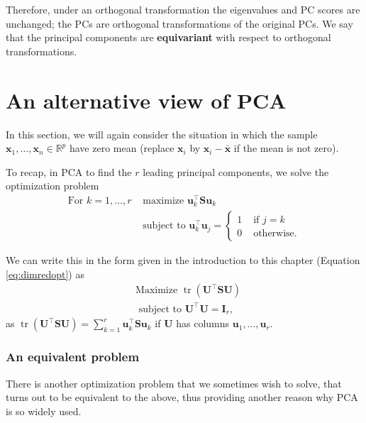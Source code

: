 \documentclass[
]{book}
\theoremstyle{definition}
\theoremstyle{definition}
\theoremstyle{definition}
\theoremstyle{definition}
\theoremstyle{remark}
\begin{document}
Therefore, under an orthogonal transformation the eigenvalues and PC scores are unchanged; the PCs are orthogonal transformations of the original PCs. We say that the principal components are \textbf{equivariant} with respect to orthogonal transformations.

\section{An alternative view of PCA}\label{an-alternative-view-of-pca}

In this section, we will again consider the situation in which the sample \(\mathbf x_1, \ldots ,  \mathbf x_n \in \mathbb{R}^p\) have zero mean (replace \(\mathbf x_i\) by \(\mathbf x_i-\bar{\mathbf x}\) if the mean is not zero).

To recap, in PCA to find the \(r\) leading principal components, we solve the optimization problem
\begin{align*}
\mbox{For } k=1, \ldots, r &\mbox{ maximize } \mathbf u_k^\top \mathbf S\mathbf u_k \\
 &\mbox{ subject to } \mathbf u_k^\top \mathbf u_j = \begin{cases}
 1  &\mbox{ if } j=k\\
 0 & \mbox{ otherwise.}
 \end{cases}
 \end{align*}

We can write this in the form given in the introduction to this chapter (Equation \eqref{eq:dimredopt}) as
\begin{align*}
&\mbox{Maximize } \operatorname{tr}(\mathbf U^\top \mathbf S\mathbf U) \\
 &\mbox{ subject to } \mathbf U^\top \mathbf U=\mathbf I_r,
 \end{align*}
as \(\operatorname{tr}(\mathbf U^\top \mathbf S\mathbf U) = \sum_{k=1}^r \mathbf u_k^\top \mathbf S\mathbf u_k\) if \(\mathbf U\) has columns \(\mathbf u_1, \ldots, \mathbf u_r\).

\subsubsection*{An equivalent problem}\label{an-equivalent-problem}

There is another optimization problem that we sometimes wish to solve, that turns out to be equivalent to the above, thus providing another reason why PCA is so widely used.
\end{document}
